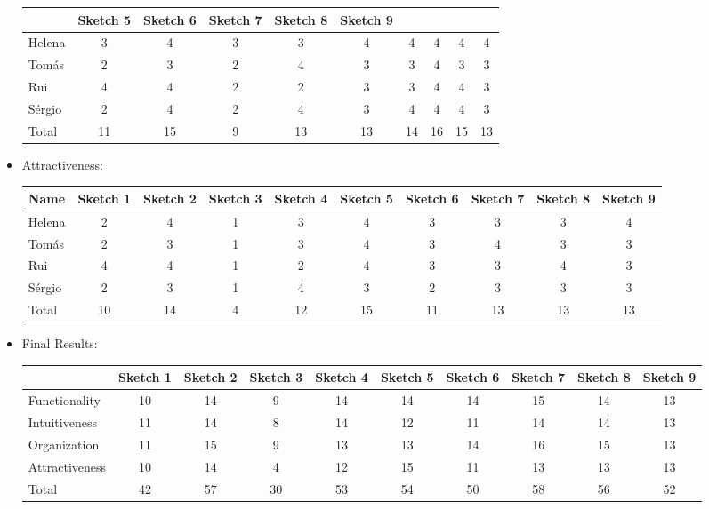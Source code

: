 \begin{itemize}
\begin{table}[H]
\begin{tabular}{l*{9}{c}}
        & Sketch 5 & Sketch 6 & Sketch 7 & Sketch 8 & Sketch 9 \\
        \hline 
        Helena & 3 & 4 & 3 & 3 & 4 & 4 & 4 & 4 & 4 \\
        Tomás & 2 & 3 & 2 & 4 & 3 & 3 & 4 & 3 & 3 \\ 
        Rui & 4 & 4 & 2 & 2 & 3 & 3 & 4 & 4 & 3 \\ 
        Sérgio & 2 & 4 & 2 & 4 & 3 & 4 & 4 & 4 & 3 \\ 
        \hline
        Total & 11 & 15 & 9 & 13 & 13 & 14 & 16 & 15 & 13 \\
    \end{tabular}
\end{table}
\item Attractiveness: 
\begin{table}[H]
    \begin{tabular}{l*{9}{c}}
        Name & Sketch 1 & Sketch 2 & Sketch 3 & Sketch 4 
        & Sketch 5 & Sketch 6 & Sketch 7 & Sketch 8 & Sketch 9 \\
        \hline 
        Helena & 2 & 4 & 1 & 3 & 4 & 3 & 3 & 3 & 4 \\
        Tomás & 2 & 3 & 1 & 3 & 4 & 3 & 4 & 3 & 3 \\ 
        Rui & 4 & 4 & 1 & 2 & 4 & 3 & 3 & 4 & 3 \\ 
        Sérgio & 2 & 3 & 1 & 4 & 3 & 2 & 3 & 3 & 3 \\ 
        \hline
        Total & 10 & 14 & 4 & 12 & 15 & 11 & 13 & 13 & 13 \\
    \end{tabular}
\end{table}
\item Final Results:
\begin{table}[H]
    \begin{tabular}{l*{9}{c}}
        & Sketch 1 & Sketch 2 & Sketch 3 & Sketch 4 
        & Sketch 5 & Sketch 6 & Sketch 7 & Sketch 8 & Sketch 9 \\
        \hline 
        Functionality & 10 & 14 & 9 & 14 & 14 & 14 & 15 & 14 & 13 \\
        Intuitiveness & 11 & 14 & 8 & 14 & 12 & 11 & 14 & 14 & 13 \\ 
        Organization & 11 & 15 & 9 & 13 & 13 & 14 & 16 & 15 & 13 \\ 
        Attractiveness & 10 & 14 & 4 & 12 & 15 & 11 & 13 & 13 & 13 \\ 
        \hline
        Total & 42 & 57 & 30 & 53 & 54 & 50 & 58 & 56 & 52 \\
    \end{tabular}
\end{table}
\end{itemize} \par
